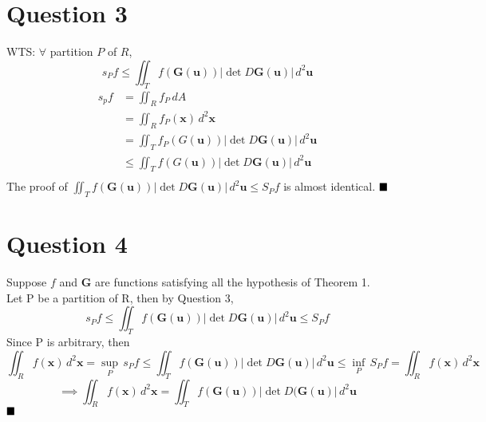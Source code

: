 \documentclass[11pt]{article}
\newcommand{\tb}[1]{\textbf{#1}}
\newcommand{\vx}[0]{\tb{x}}
\newcommand{\vu}[0]{\tb{u}}
\newcommand{\qed}[0]{$\hfill\blacksquare$}
\begin{document}
\section*{Question 3}
WTS: $\forall$ partition $P$ of $R$,
$$s_Pf \leq \iint_T f(\tb{G}(\vu))|\det D\tb{G}(\tb{u})| \, d^2 \vu$$
\begin{align*}
	s_pf &= \iint_R f_P \,dA \tag{by Q2}\\
	&= \iint_R f_P(\vx) \, d^2\vx\\
	&= \iint_T f_P(G(\vu))|\det D\tb{G}(\vu)| \, d^2\vu  \tag{by Q1}\\
	&\leq \iint_T f(G(\vu))|\det D\tb{G}(\vu)| \, d^2\vu\tag{by online notes S4.2 Theorem 1.3 since $f_P \leq f$}\\
\end{align*}
The proof of $\iint_T f(\tb{G}(\vu))|\det D\tb{G}(\tb{u})| \, d^2 \vu \leq S_Pf$ is almost identical.
\qed
\newpage
\section*{Question 4}
Suppose $f$ and $\tb{G}$ are functions satisfying all the hypothesis of Theorem 1. \\
Let P be a partition of R, then by Question 3,
$$s_Pf \leq \iint_T f(\tb{G}(\vu))|\det D\tb{G}(\tb{u})| \, d^2 \vu \leq S_Pf$$
Since P is arbitrary, then
$$\iint_R f(\vx)\,d^2\vx = \underset{P}{\sup}\,s_Pf \leq \iint_T f(\tb{G}(\vu))|\det D\tb{G}(\tb{u})| \, d^2 \vu \leq \underset{P}{\inf}\,S_Pf = \iint_R f(\vx) \,d^2\vx$$
$$\implies \iint_R f(\vx)\,d^2\vx = \iint_T f(\tb{G}(\vu)) |\det D(\tb{G}(\vu)|\,d^2\vu$$
\qed
\end{document}
